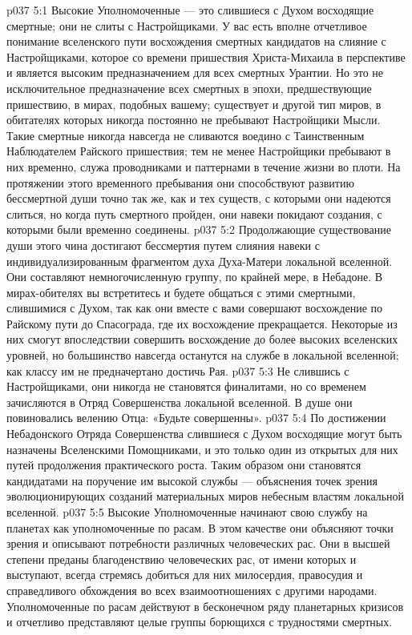 \vs p037 5:1 Высокие Уполномоченные --- это слившиеся с Духом восходящие смертные; они не слиты с Настройщиками. У вас есть вполне отчетливое понимание вселенского пути восхождения смертных кандидатов на слияние с Настройщиками, которое со времени пришествия Христа\hyp{}Михаила в перспективе и является высоким предназначением для всех смертных Урантии. Но это не исключительное предназначение всех смертных в эпохи, предшествующие пришествию, в мирах, подобных вашему; существует и другой тип миров, в обитателях которых никогда постоянно не пребывают Настройщики Мысли. Такие смертные никогда навсегда не сливаются воедино с Таинственным Наблюдателем Райского пришествия; тем не менее Настройщики пребывают в них временно, служа проводниками и паттернами в течение жизни во плоти. На протяжении этого временного пребывания они способствуют развитию бессмертной души точно так же, как и тех существ, с которыми они надеются слиться, но когда путь смертного пройден, они навеки покидают создания, с которыми были временно соединены.
\vs p037 5:2 Продолжающие существование души этого чина достигают бессмертия путем слияния навеки с индивидуализированным фрагментом духа Духа\hyp{}Матери локальной вселенной. Они составляют немногочисленную группу, по крайней мере, в Небадоне. В мирах\hyp{}обителях вы встретитесь и будете общаться с этими смертными, слившимися с Духом, так как они вместе с вами совершают восхождение по Райскому пути до Спасограда, где их восхождение прекращается. Некоторые из них смогут впоследствии совершить восхождение до более высоких вселенских уровней, но большинство навсегда останутся на службе в локальной вселенной; как классу им не предначертано достичь Рая.
\vs p037 5:3 Не слившись с Настройщиками, они никогда не становятся финалитами, но со временем зачисляются в Отряд Совершенства локальной вселенной. В душе они повиновались велению Отца: «Будьте совершенны».
\vs p037 5:4 \pc По достижении Небадонского Отряда Совершенства слившиеся с Духом восходящие могут быть назначены Вселенскими Помощниками, и это только один из открытых для них путей продолжения практического роста. Таким образом они становятся кандидатами на поручение им высокой службы --- объяснения точек зрения эволюционирующих созданий материальных миров небесным властям локальной вселенной.
\vs p037 5:5 Высокие Уполномоченные начинают свою службу на планетах как уполномоченные по расам. В этом качестве они объясняют точки зрения и описывают потребности различных человеческих рас. Они в высшей степени преданы благоденствию человеческих рас, от имени которых и выступают, всегда стремясь добиться для них милосердия, правосудия и справедливого обхождения во всех взаимоотношениях с другими народами. Уполномоченные по расам действуют в бесконечном ряду планетарных кризисов и отчетливо представляют целые группы борющихся с трудностями смертных.
